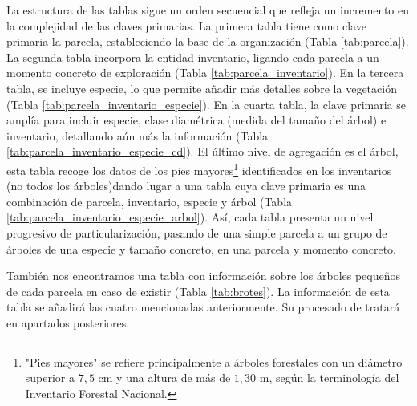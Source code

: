 \medskip

La estructura de las tablas sigue un orden secuencial que refleja un incremento en la complejidad de las claves primarias. La primera tabla tiene como clave primaria la parcela, estableciendo la base de la organización (Tabla \ref{tab:parcela}). La segunda tabla incorpora la entidad inventario, ligando cada parcela a un momento concreto de exploración (Tabla \ref{tab:parcela_inventario}). En la tercera tabla, se incluye especie, lo que permite añadir más detalles sobre la vegetación (Tabla \ref{tab:parcela_inventario_especie}). En la cuarta tabla, la clave primaria se amplía para incluir especie, clase diamétrica (medida del tamaño del árbol) e inventario, detallando aún más la información (Tabla \ref{tab:parcela_inventario_especie_cd}). El último nivel de agregación es el árbol, esta tabla recoge los datos de los pies mayores\footnote{"Pies mayores" se refiere principalmente a árboles forestales con un diámetro superior a \(7,5\) cm y una altura de más de \(1,30\) m, según la terminología del Inventario Forestal Nacional.} identificados en los inventarios (no todos los árboles)dando lugar a una tabla cuya clave primaria es una combinación de parcela, inventario, especie y árbol (Tabla \ref{tab:parcela_inventario_especie_arbol}). Así, cada tabla presenta un nivel progresivo de particularización, pasando de una simple parcela a un grupo de árboles de una especie y tamaño concreto, en una parcela y momento concreto.

También nos encontramos una tabla con información sobre los árboles pequeños de cada parcela en caso de existir (Tabla \ref{tab:brotes}). La información de esta tabla se añadirá las cuatro mencionadas anteriormente. Su procesado de tratará en apartados posteriores.

